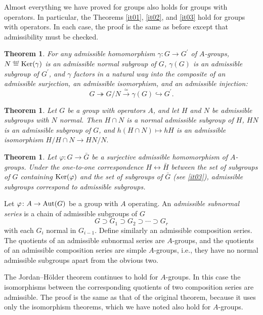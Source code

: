 \documentclass[a4paper,11pt,final]{memoir}%
\newtheorem{theorem}[X]{Theorem}
\theoremstyle{nonumberplain}
\begin{document}
Almost everything we have proved for groups also holds for groups with
operators. In particular, the Theorems \ref{it01}, \ref{it02}, and \ref{it03}
hold for groups with operators. In each case, the proof is the same as before
except that admissibility must be checked.

\begin{theorem}
\label{ns24}For any admissible homomorphism $\gamma\colon G\rightarrow
G^{\prime}$ of $A$-groups, $N\overset{\df}{=}\Ker(\gamma)$ is
an admissible normal subgroup of $G$, $\gamma(G)$ is an admissible subgroup of
$G^{\prime}$, and $\gamma$ factors in a natural way into the composite of an
admissible surjection, an admissible isomorphism, and an admissible
injection:
\[
G\twoheadrightarrow G/N\overset{\simeq}{\rightarrow}\gamma(G)\hookrightarrow
G^{\prime}.
\]

\end{theorem}

\begin{theorem}
\label{ns25}Let $G$ be a group with operators $A$, and let $H$ and $N$ be
admissible subgroups with $N$ normal. Then $H\cap N$ is a normal admissible
subgroup of $H$, $HN$ is an admissible subgroup of $G$, and $h(H\cap N)\mapsto
hH$ is an admissible isomorphism $H/H\cap N\rightarrow HN/N.$
\end{theorem}

\begin{theorem}
\label{ns26}Let $\varphi\colon G\rightarrow\bar{G}$ be a surjective admissible
homomorphism of $A$-groups. Under the one-to-one correspondence
$H\leftrightarrow\bar{H}$ between the set of subgroups of $G$ containing
$\operatorname{Ker}(\varphi)$ and the set of subgroups of $\bar{G}$ (see \ref{it03}),
admissible subgroups correspond to admissible subgroups.
\end{theorem}

Let $\varphi\colon A\rightarrow\operatorname{Aut}(G)$ be a group with $A$ operating. An
\emph{admissible subnormal series\/}%
is a chain of admissible subgroups of $G$
\[
G\supset G_{1}\supset G_{2}\supset\cdots\supset G_{r}%
\]
with each $G_{i}$ normal in $G_{i-1}$. Define similarly an admissible
composition series. The quotients of an admissible subnormal series are
$A$-groups, and the quotients of an admissible composition series are simple
$A$-groups, i.e., they have no normal admissible subgroups apart from the
obvious two.

The Jordan--H\"older theorem continues to hold for $A$-groups. In this case
the isomorphisms between the corresponding quotients of two composition series
are admissible. The proof is the same as that of the original theorem, because
it uses only the isomorphism theorems, which we have noted also hold for $A$-groups.
\end{document}
